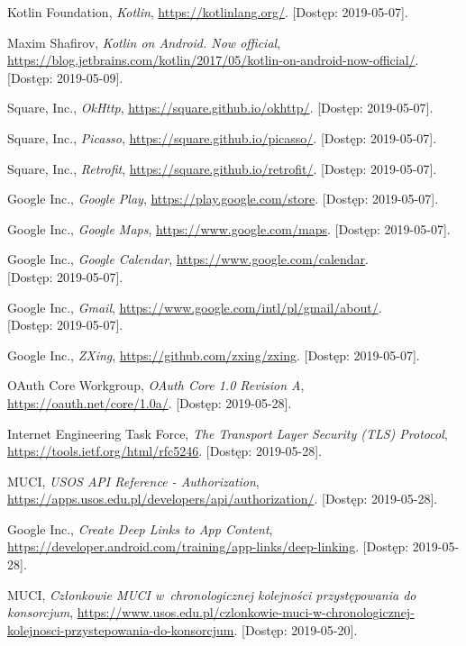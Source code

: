 \documentclass{pracamgr}
\begin{document}
\begin{thebibliography}{99}
 Kotlin Foundation, \textit{Kotlin}, \url{https://kotlinlang.org/}. [Dostęp: 2019-05-07].

 Maxim Shafirov, \textit{Kotlin on Android. Now official},
	\url{https://blog.jetbrains.com/kotlin/2017/05/kotlin-on-android-now-official/}. [Dostęp: 2019-05-09].

 Square, Inc., \textit{OkHttp},	\url{https://square.github.io/okhttp/}. [Dostęp: 2019-05-07].

 Square, Inc., \textit{Picasso}, \url{https://square.github.io/picasso/}. [Dostęp: 2019-05-07].

 Square, Inc., \textit{Retrofit}, \url{https://square.github.io/retrofit/}. [Dostęp: 2019-05-07].


 Google Inc., \textit{Google Play}, \url{https://play.google.com/store}. [Dostęp: 2019-05-07].

 Google Inc., \textit{Google Maps},	\url{https://www.google.com/maps}. [Dostęp: 2019-05-07].

 Google Inc., \textit{Google Calendar},	\url{https://www.google.com/calendar}.\\
{[Dostęp: 2019-05-07]}.

 Google Inc., \textit{Gmail}, \url{https://www.google.com/intl/pl/gmail/about/}.\\
{[Dostęp: 2019-05-07]}.

 Google Inc., \textit{ZXing}, \url{https://github.com/zxing/zxing}. [Dostęp: 2019-05-07].

 OAuth Core Workgroup, \textit{OAuth Core 1.0 Revision A}, \url{https://oauth.net/core/1.0a/}. [Dostęp: 2019-05-28].

 Internet Engineering Task Force, \textit{The Transport Layer Security (TLS) Protocol}, \url{https://tools.ietf.org/html/rfc5246}. [Dostęp: 2019-05-28].

 MUCI, \textit{USOS API Reference - Authorization}, \url{https://apps.usos.edu.pl/developers/api/authorization/}. [Dostęp: 2019-05-28].

 Google Inc., \textit{Create Deep Links to App Content}, \url{https://developer.android.com/training/app-links/deep-linking}. [Dostęp: 2019-05-28].

 MUCI, \textit{Członkowie MUCI w~chronologicznej kolejności przystępowania do konsorcjum}, \url{https://www.usos.edu.pl/czlonkowie-muci-w-chronologicznej-kolejnosci-przystepowania-do-konsorcjum}. [Dostęp: 2019-05-20].


\end{thebibliography}
\end{document}
